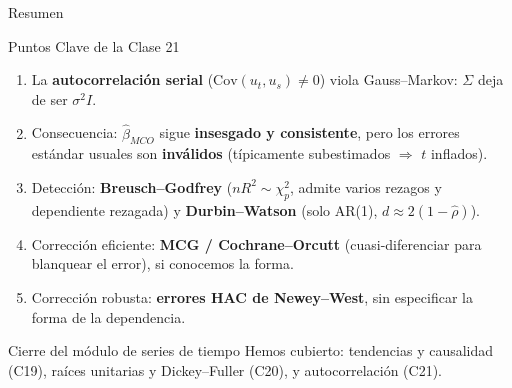 \documentclass{beamer}
\begin{document}
\begin{frame}{Resumen}

\begin{block}{Puntos Clave de la Clase 21}
\begin{enumerate}
    \item La \textbf{autocorrelación serial} ($\text{Cov}(u_t,u_s)\neq0$) viola Gauss--Markov: $\Sigma$ deja de ser $\sigma^2 I$.
    \item Consecuencia: $\hat\beta_{MCO}$ sigue \textbf{insesgado y consistente}, pero los errores estándar usuales son \textbf{inválidos} (típicamente subestimados $\Rightarrow$ $t$ inflados).
    \item Detección: \textbf{Breusch--Godfrey} ($nR^2\sim\chi^2_p$, admite varios rezagos y dependiente rezagada) y \textbf{Durbin--Watson} (solo AR(1), $d\approx2(1-\hat\rho)$).
    \item Corrección eficiente: \textbf{MCG / Cochrane--Orcutt} (cuasi-diferenciar para blanquear el error), si conocemos la forma.
    \item Corrección robusta: \textbf{errores HAC de Newey--West}, sin especificar la forma de la dependencia.
\end{enumerate}
\end{block}

\begin{alertblock}{Cierre del módulo de series de tiempo}
Hemos cubierto: tendencias y causalidad (C19), raíces unitarias y Dickey--Fuller (C20), y autocorrelación (C21).
\end{alertblock}

\end{frame}


\end{document}
